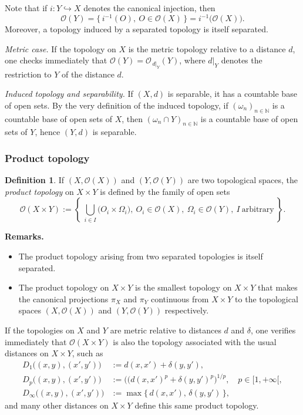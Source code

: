 \documentclass[12pt]{article}
\theoremstyle{definition}
\newtheorem{definition}{Definition}[section]
\begin{document}
Note that if $i:Y\hookrightarrow X$ denotes the canonical injection, then
\[
\mathcal{O}(Y)=\{\,i^{-1}(O),\ O\in\mathcal{O}(X)\,\}=i^{-1}\bigl(\mathcal{O}(X)\bigr).
\]
Moreover, a topology induced by a separated topology is itself separated.

\medskip\noindent
\textit{Metric case.}
If the topology on $X$ is the metric topology relative to a distance $d$, one checks immediately that
$\mathcal{O}(Y)=\mathcal{O}_{\,d|_Y}(Y)$, where $d|_Y$ denotes the restriction to $Y$ of the distance $d$.

\medskip\noindent
\textit{Induced topology and separability.}
If $(X,d)$ is separable, it has a countable base of open sets.
By the very definition of the induced topology, if $(\omega_n)_{n\in\mathbb{N}}$ is a countable base of open sets of $X$, then $(\omega_n\cap Y)_{n\in\mathbb{N}}$ is a countable base of open sets of $Y$, hence $(Y,d)$ is separable.

\subsubsection{Product topology}

\begin{definition}
If $(X,\mathcal{O}(X))$ and $(Y,\mathcal{O}(Y))$ are two topological spaces, the \emph{product topology} on $X\times Y$ is defined by the family of open sets
\[
\mathcal{O}(X\times Y):=\left\{\ \bigcup_{i\in I}\bigl(O_i\times \Omega_i\bigr),\ O_i\in\mathcal{O}(X),\ \Omega_i\in\mathcal{O}(Y),\ I\ \text{arbitrary}\ \right\}.
\]
\end{definition}

\noindent\textbf{Remarks.}
\begin{itemize}[leftmargin=1.5em]
\item The product topology arising from two separated topologies is itself separated.
\item The product topology on $X\times Y$ is the smallest topology on $X\times Y$ that makes the canonical projections $\pi_X$ and $\pi_Y$ continuous from $X\times Y$ to the topological spaces $(X,\mathcal{O}(X))$ and $(Y,\mathcal{O}(Y))$ respectively.
\end{itemize}

If the topologies on $X$ and $Y$ are metric relative to distances $d$ and $\delta$, one verifies immediately that $\mathcal{O}(X\times Y)$ is also the topology associated with the usual distances on $X\times Y$, such as
\[
\begin{aligned}
D_1\bigl((x,y),(x',y')\bigr)&:= d(x,x')+\delta(y,y'),\\
D_p\bigl((x,y),(x',y')\bigr)&:= \bigl((d(x,x')^p+\delta(y,y')^p\bigr)^{1/p},\quad p\in[1,+\infty[,\\
D_\infty\bigl((x,y),(x',y')\bigr)&:= \max\{\,d(x,x'),\,\delta(y,y')\,\},
\end{aligned}
\]
and many other distances on $X\times Y$ define this same product topology.
\end{document}
